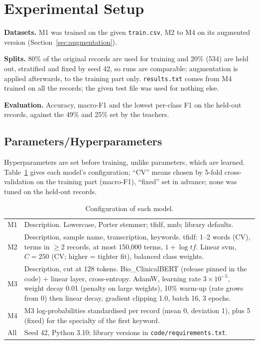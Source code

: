 \documentclass[twocolumn,10pt]{article}
\begin{document}
\section{Experimental Setup}
\label{sec:setup}

\textbf{Datasets.} M1 was trained on the given \texttt{train.csv}, M2 to M4 on its augmented version (Section~\ref{sec:augmentation}).

\textbf{Splits.} 80\% of the original records are used for training and 20\% (534) are held out, stratified and fixed by seed 42, so runs are comparable; augmentation is applied afterwards, to the training part only. \texttt{results.txt} comes from M4 trained on all the records; the given test file was used for nothing else.

\textbf{Evaluation.} Accuracy, macro-F1 and the lowest per-class F1 on the held-out records, against the 49\% and 25\% set by the teachers.

\subsection{Parameters/Hyperparameters}

Hyperparameters are set before training, unlike parameters, which are learned. Table~\ref{tab:hyper} gives each model's configuration; ``CV'' means chosen by 5-fold cross-validation on the training part (macro-F1), ``fixed'' set in advance; none was tuned on the held-out records.

\begin{table}[!ht]
\centering
\caption{Configuration of each model.}
\label{tab:hyper}
\footnotesize
\setlength{\tabcolsep}{3pt}
\begin{tabular}{@{}l@{\hspace{4pt}}p{6.65cm}@{}}
\toprule
M1 & Description. Lowercase, Porter stemmer; \ac{tfidf}, \ac{mnb}; library defaults. \\
M2 & Description, sample name, transcription, keywords. \ac{tfidf}: 1--2 words (CV), terms in $\geq$2 records, at most 150{,}000 terms, $1+\log tf$. Linear \ac{svm}, $C=250$ (CV; higher = tighter fit), balanced class weights. \\
M3 & Description, cut at 128 tokens. Bio\_ClinicalBERT (release pinned in the code) + linear layer, cross-entropy. AdamW, learning rate $3\!\times\!10^{-5}$, weight decay 0.01 (penalty on large weights), 10\% warm-up (rate grows from 0) then linear decay, gradient clipping 1.0, batch 16, 3 epochs. \\
M4 & M3 log-probabilities standardised per record (mean 0, deviation 1), plus 5 (fixed) for the specialty of the first keyword. \\
All & Seed 42, Python 3.10; library versions in \texttt{code/requirements.txt}. \\
\bottomrule
\end{tabular}
\end{table}
\end{document}
